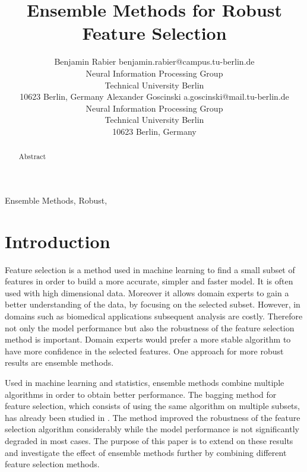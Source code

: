 \documentclass[twoside,11pt]{article}
\begin{document}
\title{Ensemble Methods for Robust Feature Selection}
\author{\name Benjamin Rabier \email benjamin.rabier@campus.tu-berlin.de \\
       \addr Neural Information Processing Group\\
       Technical University Berlin\\
       10623 Berlin, Germany
       \AND
       \name Alexander Goscinski \email a.goscinski@mail.tu-berlin.de \\
       \addr Neural Information Processing Group\\
       Technical University Berlin\\
       10623 Berlin, Germany}


\maketitle

\begin{abstract}%
  Abstract
\end{abstract}

\begin{keywords}
  Ensemble Methods, Robust, 
\end{keywords}

\section{Introduction}

Feature selection is a method used in machine learning to find a small subset of features in order to build a more accurate, simpler and faster model. It is often used with high dimensional data. Moreover it allows domain experts to gain a better understanding of the data, by focusing on the selected subset. However, in domains such as biomedical applications subsequent analysis are costly. Therefore not only the model performance but also the robustness of the feature selection method is important. Domain experts would prefer a more stable algorithm to have more confidence in the selected features. One approach for more robust results are ensemble methods.

Used in machine learning and statistics, ensemble methods combine multiple algorithms in order to obtain better performance. The bagging method for feature selection, which consists of using the same algorithm on multiple subsets, has already been studied in \cite{saeys2008}. The method improved the robustness of the feature selection algorithm considerably while the model performance is not significantly degraded in most cases. The purpose of this paper is to extend on these results and investigate the effect of ensemble methods further by combining different feature selection methods.
\end{document}
